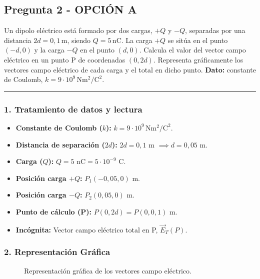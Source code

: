 \subsection{Pregunta 2 - OPCIÓN A}
\label{subsec:2A_2025_jun_res}

\begin{cajaenunciado}
Un dipolo eléctrico está formado por dos cargas, $+Q$ y $-Q$, separadas por una distancia $2d=0,1\,\text{m}$, siendo $Q=5\,\text{nC}$. La carga $+Q$ se sitúa en el punto $(-d, 0)$ y la carga $-Q$ en el punto $(d, 0)$. Calcula el valor del vector campo eléctrico en un punto P de coordenadas $(0,2d)$. Representa gráficamente los vectores campo eléctrico de cada carga y el total en dicho punto.
\textbf{Dato:} constante de Coulomb, $k=9\cdot10^{9}\,\text{N}\text{m}^2/\text{C}^2$.
\end{cajaenunciado}
\hrule

\subsubsection*{1. Tratamiento de datos y lectura}
\begin{itemize}
    \item \textbf{Constante de Coulomb ($k$):} $k=9\cdot10^{9}\,\text{N}\text{m}^2/\text{C}^2$.
    \item \textbf{Distancia de separación ($2d$):} $2d = 0,1$ m $\implies d = 0,05$ m.
    \item \textbf{Carga ($Q$):} $Q = 5 \text{ nC} = 5 \cdot 10^{-9}$ C.
    \item \textbf{Posición carga $+Q$:} $P_1(-0,05, 0)$ m.
    \item \textbf{Posición carga $-Q$:} $P_2(0,05, 0)$ m.
    \item \textbf{Punto de cálculo (P):} $P(0, 2d) = P(0, 0,1)$ m.
    \item \textbf{Incógnita:} Vector campo eléctrico total en P, $\vec{E}_T(P)$.
\end{itemize}

\subsubsection*{2. Representación Gráfica}
\begin{figure}[H]
    \centering
    \caption{Representación gráfica de los vectores campo eléctrico.}
\end{figure}

